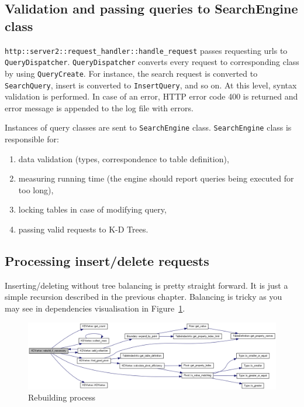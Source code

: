 \documentclass[10pt,a4paper]{article}
\begin{document}
\subsection{Validation and passing queries to SearchEngine class}

\verb|http::server2::request_handler::handle_request| passes requesting urls to \verb|QueryDispatcher|. \verb|QueryDispatcher| converts every request to corresponding class by using \verb|QueryCreate|. For instance, the search request is converted to \verb|SearchQuery|, insert is converted to \verb|InsertQuery|, and so on. At this level, syntax validation is performed. In case of an error, HTTP error code 400 is returned and error message is appended to the log file with errors. 

Instances of query classes are sent to \verb|SearchEngine| class. \verb|SearchEngine| class is responsible for:
\begin{enumerate}
\item data validation (types, correspondence to table definition),
\item measuring running time (the engine should report queries being executed for too long),
\item locking tables in case of modifying query,
\item passing valid requests to K-D Trees.
\end{enumerate}

\subsection{Processing insert/delete requests}

Inserting/deleting without tree balancing is pretty straight forward. It is just a simple recursion described in the previous chapter. Balancing is tricky as you may see in dependencies visualisation in Figure~\ref{fig:rebuild}.

\begin{figure}[h!]
\centering
  \includegraphics[width=16cm]{rebuild}
  \caption{Rebuilding process}
  \label{fig:rebuild}
\end{figure}
\end{document}
